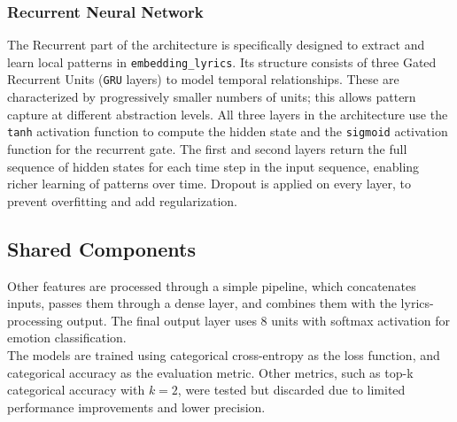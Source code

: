 \subsubsection*{Recurrent Neural Network}
The Recurrent part of the architecture is specifically designed to extract and learn
local patterns in \texttt{embedding\_lyrics}.
Its structure consists of three Gated Recurrent Units (\texttt{GRU} layers)
to model temporal relationships. These are characterized by progressively smaller
numbers of units; this allows pattern capture at different abstraction levels.
All three layers in the architecture use the \texttt{tanh} activation function
to compute the hidden state and
the \texttt{sigmoid} activation function for the recurrent gate.
The first and second layers return the full sequence of hidden states for each
time step in the input sequence, enabling richer learning of patterns over time.
Dropout is applied on every layer, to prevent overfitting and add regularization.

\subsection*{Shared Components}

Other features are processed through a simple pipeline, which concatenates inputs,
passes them through a dense layer, and combines them with the lyrics-processing
output. The final output layer uses 8 units with softmax activation for emotion
classification.\\
The models are trained using categorical cross-entropy as the loss function, and
categorical accuracy as the evaluation metric. Other metrics, such as top-k
categorical accuracy with $k=2$, were tested but discarded due to limited
performance improvements and lower precision.


